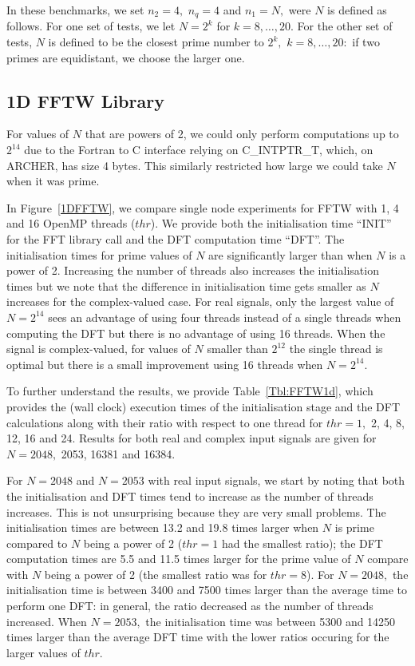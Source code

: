 \documentclass[a4paper]{article}
\begin{document}
In these benchmarks, we set $n_2=4,$ $n_q=4$ and $n_1=N,$ were $N$ is
defined as follows.  For one set of tests, we let $N=2^k$ for
$k=8,\ldots,20.$ For the other set of tests, $N$ is defined to be the
closest prime number to $2^k,$ $k=8,\ldots,20:$ if two primes are
equidistant, we choose the larger one.


\subsection{1D FFTW Library}\label{Sec:1DFFTW}
For values of $N$ that are powers of 2, we could only perform
computations up to $2^{14}$ due to the Fortran to C interface relying on
C\_INTPTR\_T, which, on ARCHER, has size 4 bytes. This similarly
restricted how large we could take $N$ when it was prime.

In Figure~\ref{1DFFTW}, we compare single node experiments for FFTW
with 1, 4 and 16 OpenMP threads ($thr$). We provide both the initialisation
time ``INIT'' for the FFT library call and the DFT computation time
``DFT''.  The initialisation times for prime values of $N$ are
significantly larger than when $N$ is a power of 2. Increasing the
number of threads also increases the initialisation times but we note
that the difference in initialisation time gets smaller as $N$
increases for the complex-valued case. For real signals, only the
largest value of $N=2^{14}$ sees an advantage of using four threads
instead of a single threads when computing the DFT but there is no
advantage of using 16 threads. When the signal is complex-valued, for
values of $N$ smaller than $2^{12}$ the single thread is optimal but
there is a small improvement using 16 threads when $N=2^{14}$.

To further understand the results, we provide Table~\ref{Tbl:FFTW1d},
which provides the (wall clock) execution times of the initialisation
stage and the DFT calculations along with their ratio with respect to
one thread for $thr=1,$ 2, 4, 8, 12, 16 and 24. Results for both real
and complex input signals are given for $N=2048,$ 2053, 16381 and
16384.

For $N=2048$ and $N=2053$ with real input signals, we start by
noting that both the initialisation and DFT times tend to increase as
the number of threads increases. This is not unsurprising because they
are very small problems. The
initialisation times are between 13.2 and 19.8 times larger when $N$
is prime compared to $N$ being a power of 2 ($thr=1$ had the smallest
ratio); the DFT computation times are 5.5 and 11.5 times larger for
the prime value of $N$ compare with $N$ being a power of 2 (the
smallest ratio was for $thr=8$). For $N=2048,$ the initialisation time
is between 3400 and 7500 times larger than the average time to perform
one DFT: in general, the ratio decreased as the number of threads
increased. When $N=2053,$ the initialisation time was between 5300 and
14250 times larger than the average DFT time with the lower ratios
occuring for the larger values of $thr.$
\end{document}
